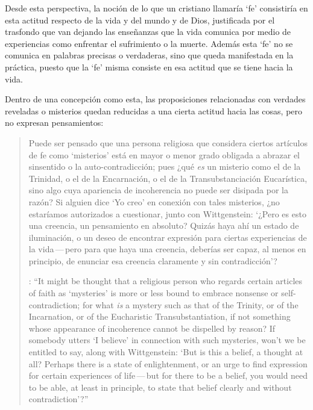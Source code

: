 %
%
Desde esta perspectiva, la noción de lo que un cristiano llamaría `fe' consistiría en esta actitud respecto de la vida y del mundo y de Dios, justificada por el trasfondo que van dejando las enseñanzas que la vida comunica por medio de experiencias como enfrentar el sufrimiento o la muerte. Además esta `fe' no se comunica en palabras precisas o verdaderas, sino que queda manifestada en la práctica, puesto que la `fe' misma consiste en esa actitud que se tiene hacia la vida.

Dentro de una concepción como esta, las proposiciones relacionadas con verdades reveladas o misterios quedan reducidas a una cierta actitud hacia las cosas, pero no expresan pensamientos: \blockquote[{\Cite[211]{teichmann2008ans}}: \enquote{It might be thought that a religious person who regards certain articles of faith as `mysteries' is more or less bound to embrace nonsense or self-contradiction; for what \emph{is} a mystery such as that of the Trinity, or of the Incarnation, or of the Eucharistic Transubstantiation, if not something whose appearance of incoherence cannot be dispelled by reason? If somebody utters `I believe' in connection with such mysteries, won't we be entitled to say, along with Wittgenstein: `But is this a belief, a thought at all? Perhaps there is a state of enlightenment, or an urge to find expression for certain experiences of life\,---\,but for there to be a belief, you would need to be able, at least in principle, to state that belief clearly and without contradiction'?}]{Puede ser pensado que una persona religiosa que considera ciertos artículos de fe como `misterios' está en mayor o menor grado obligada a abrazar el sinsentido o la auto-contradicción; pues ¿qué \emph{es} un misterio como el de la Trinidad, o el de la Encarnación, o el de la Transubstanciación Eucarística, sino algo cuya apariencia de incoherencia no puede ser disipada por la razón? Si alguien dice `Yo creo' en conexión con tales misterios, ¿no estaríamos autorizados a cuestionar, junto con Wittgenstein: `¿Pero es esto una creencia, un pensamiento en absoluto? Quizás haya ahí un estado de iluminación, o un deseo de encontrar expresión para ciertas experiencias de la vida\,---\,pero para que haya una creencia, deberías ser capaz, al menos en principio, de enunciar esa creencia claramente y sin contradicción'?}

